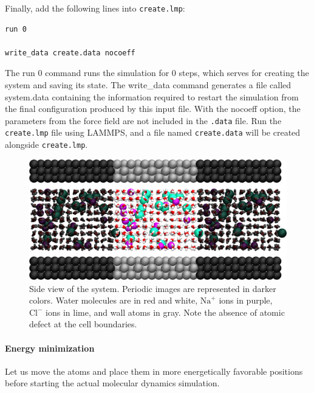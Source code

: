 \documentclass[9pt,tutorial]{livecoms}
\newcommand{\lmpcmd}[1]{\colorbox{listing}{\textcolor{command}{\small{#1}}}} %
\newcommand{\flecmd}[1]{\textcolor{command}{\texttt{#1}}} %
\begin{document}
Finally, add the following lines into \flecmd{create.lmp}:
\begin{lstlisting}
run 0

write_data create.data nocoeff
\end{lstlisting}
The \lmpcmd{run 0} command runs the simulation for 0 steps, which {\color{blue} serves} for
creating the system and saving its state.  The \lmpcmd{write\_data} command
generates a file called \lmpcmd{system.data} containing the information required
to restart the simulation from the final configuration produced by this input
file.  With the \lmpcmd{nocoeff} option, the parameters from the force field are
not included in the \flecmd{.data} file.  Run the \flecmd{create.lmp} file using LAMMPS,
and a file named \flecmd{create.data} will be created alongside \flecmd{create.lmp}.

\begin{figure}
\centering
\includegraphics[width=\linewidth]{NANOSHEAR-system}
\caption{Side view of the system.  Periodic images are represented in darker colors.
Water molecules are in red and white, $\text{Na}^+$ ions in purple, $\text{Cl}^-$
ions in lime, and wall atoms in gray.  Note the absence of atomic defect at the
cell boundaries.}
\label{fig:NANOSHEAR-system}
\end{figure}

\paragraph{Energy minimization}

Let us move the atoms and place them in more energetically favorable positions
before starting the actual molecular dynamics simulation.
\end{document}
